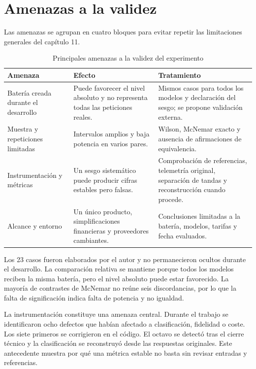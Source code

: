 \section{Amenazas a la validez}
\label{sec:amenazas_validez}

Las amenazas se agrupan en cuatro bloques para evitar repetir las limitaciones generales del capítulo 11.

\begin{table}[H]
\centering
\small
\caption{Principales amenazas a la validez del experimento}
\label{tab:amenazas_validez}
\begin{tabular}{|P{3.2cm}|P{5.0cm}|P{5.0cm}|}
\hline
\textbf{Amenaza} & \textbf{Efecto} & \textbf{Tratamiento} \\
\hline
Batería creada durante el desarrollo & Puede favorecer el nivel absoluto y no representa todas las peticiones reales. & Mismos casos para todos los modelos y declaración del sesgo; se propone validación externa. \\
\hline
Muestra y repeticiones limitadas & Intervalos amplios y baja potencia en varios pares. & Wilson, McNemar exacto y ausencia de afirmaciones de equivalencia. \\
\hline
Instrumentación y métricas & Un sesgo sistemático puede producir cifras estables pero falsas. & Comprobación de referencias, telemetría original, separación de tandas y reconstrucción cuando procede. \\
\hline
Alcance y entorno & Un único producto, simplificaciones financieras y proveedores cambiantes. & Conclusiones limitadas a la batería, modelos, tarifas y fecha evaluados. \\
\hline
\end{tabular}
\end{table}

Los 23 casos fueron elaborados por el autor y no permanecieron ocultos durante el desarrollo. La comparación relativa se mantiene porque todos los modelos reciben la misma batería, pero el nivel absoluto puede estar favorecido. La mayoría de contrastes de McNemar no reúne seis discordancias, por lo que la falta de significación indica falta de potencia y no igualdad.

La instrumentación constituye una amenaza central. Durante el trabajo se identificaron ocho defectos que habían afectado a clasificación, fidelidad o coste. Los siete primeros se corrigieron en el código. El octavo se detectó tras el cierre técnico y la clasificación se reconstruyó desde las respuestas originales. Este antecedente muestra por qué una métrica estable no basta sin revisar entradas y referencias.

